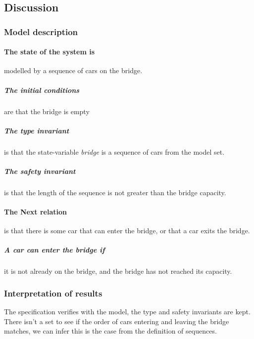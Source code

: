 \documentclass[12pt]{article}
\begin{document}
\subsection{Discussion}
\subsubsection{Model description} 
\paragraph{The state of the system is } modelled by a sequence of cars on the
bridge.

\subparagraph{The initial conditions} are that the bridge is empty

\subparagraph{The type invariant} is that the state-variable \emph{bridge} is
a sequence of cars from the model set.

\subparagraph{The safety invariant} is that the length of the sequence is not
greater than the bridge capacity.

\paragraph{The Next relation} is that there is some car that can enter the
bridge, or that a car exits the bridge.

\subparagraph{A car can enter the bridge if } it is not already on the bridge,
and the bridge has not reached its capacity.

\subsubsection{Interpretation of results}
The specification verifies with the model, the type and safety invariants are
kept.  There isn't a set to see if the order of cars entering and leaving the
bridge matches, we can infer this is the case from the definition of
sequences.
\end{document}
